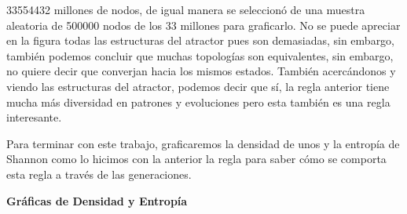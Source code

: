 \documentclass{article}
\begin{document}
\begin{itemize}
 	 	33554432 millones de nodos, de igual manera se seleccionó de una muestra aleatoria de 500000 nodos de los 33 millones para graficarlo. No se puede apreciar en la figura todas las estructuras del atractor pues son demasiadas, sin embargo, también podemos concluir que muchas topologías son equivalentes, sin embargo, no quiere decir que converjan hacia los mismos estados. También acercándonos y viendo las estructuras del atractor, podemos decir que sí, la regla anterior tiene mucha más diversidad en patrones y evoluciones pero esta también es una regla interesante. 
 	 	
 	 \end{itemize}
 	 
 	Para terminar con este trabajo, graficaremos la densidad de unos y la entropía de Shannon como lo hicimos con la anterior la regla para saber cómo se comporta esta regla a través de las generaciones. 
 	
 	\textbf{Gráficas de Densidad y Entropía}
 	
\end{document}
